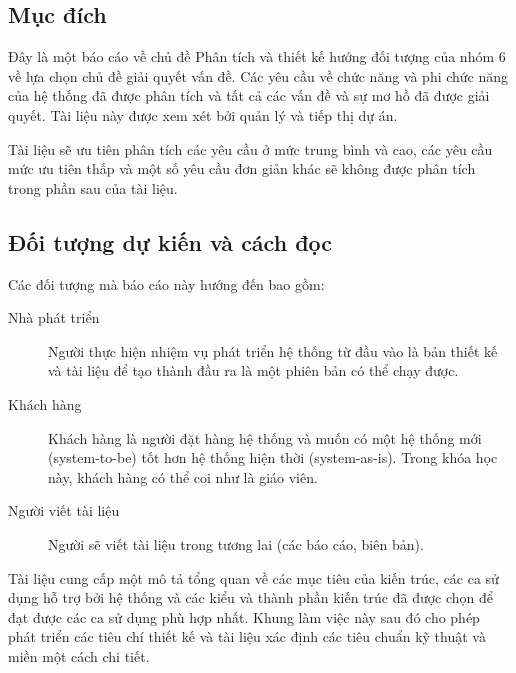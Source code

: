 \documentclass[./../main_file.tex]{subfiles}
\begin{document}
	\subsection{Mục đích}
	
	Đây là một báo cáo về chủ đề Phân tích và thiết kế hướng đối tượng của nhóm 6 về lựa chọn chủ đề giải quyết vấn đề.
	Các yêu cầu về chức năng và phi chức năng của hệ thống đã được phân tích và tất cả các vấn đề và sự mơ hồ đã được giải quyết. Tài liệu này được xem xét bởi quản lý và tiếp thị dự án.
	
	
	Tài liệu sẽ ưu tiên phân tích các yêu cầu ở mức trung bình và cao, các yêu cầu mức ưu tiên thấp và một số yêu cầu đơn giản khác sẽ không được phân tích trong phần sau của tài liệu.
	\subsection{Đối tượng dự kiến và cách đọc }
	Các đối tượng mà báo cáo này hướng đến bao gồm: 
	\begin{description}
		\item[Nhà phát triển] Người thực hiện nhiệm vụ phát triển hệ thống từ đầu vào là bản thiết kế và tài liệu để tạo thành đầu ra là một phiên bản có thể chạy được.
		\item[Khách hàng] Khách hàng là người đặt hàng hệ thống và muốn có một hệ thống mới (system-to-be) tốt hơn hệ thống hiện thời (system-as-is). Trong khóa học này, khách hàng có thể coi như là giáo viên.
		\item[Người viết tài liệu] Người sẽ viết tài liệu trong tương lai (các báo cáo, biên bản).
	\end{description}
	Tài liệu cung cấp một mô tả tổng quan về các mục tiêu của kiến trúc, các ca sử dụng hỗ trợ bởi hệ thống và các kiểu và thành phần kiến trúc đã được chọn để đạt được các ca sử dụng phù hợp nhất. Khung làm việc này sau đó cho phép phát triển các tiêu chí thiết kế và tài liệu xác định các tiêu chuẩn kỹ thuật và miền một cách chi tiết.
		
\end{document}
